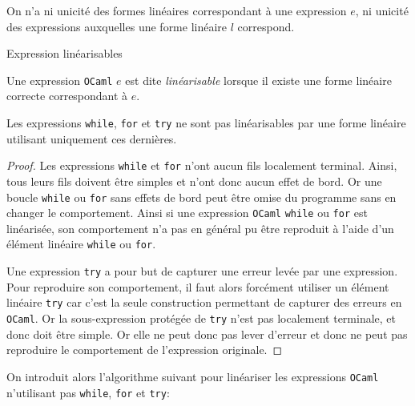 \begin{remark}
    On n'a ni unicité des formes linéaires correspondant à une expression
    $e$, ni unicité des expressions auxquelles une forme linéaire $l$
    correspond.
\end{remark}

\begin{definition}
    Expression linéarisables

    Une expression \texttt{OCaml} $e$ est dite \textit{linéarisable} lorsque
    il existe une forme linéaire correcte correspondant à $e$.
\end{definition}

\begin{proposition}
    Les expressions \textnormal{\texttt{while}}, \textnormal{\texttt{for}} et
    \textnormal{\texttt{try}} ne sont pas linéarisables par une forme linéaire
    utilisant uniquement ces dernières.
\end{proposition}

\begin{proof}
    Les expressions \texttt{while} et \texttt{for} n'ont aucun fils localement
    terminal. Ainsi, tous leurs fils doivent être simples et n'ont donc aucun
    effet de bord. Or une boucle \texttt{while} ou \texttt{for} sans effets de
    bord peut être omise du programme sans en changer le comportement. Ainsi si
    une expression \texttt{OCaml} \texttt{while} ou \texttt{for} est linéarisée,
    son comportement n'a pas en général pu être reproduit à l'aide d'un élément
    linéaire \texttt{while} ou \texttt{for}.


    Une expression \texttt{try} a pour but de capturer une erreur levée par une
    expression. Pour reproduire son comportement, il faut alors forcément
    utiliser un élément linéaire \texttt{try} car c'est la seule construction
    permettant de capturer des erreurs en \texttt{OCaml}. Or la sous-expression
    protégée de \texttt{try} n'est pas localement terminale, et donc doit être
    simple. Or elle ne peut donc pas lever d'erreur et donc ne peut pas
    reproduire le comportement de l'expression originale.
\end{proof}

On introduit alors l'algorithme suivant pour linéariser les expressions
\texttt{OCaml} n'utilisant pas \texttt{while}, \texttt{for} et \texttt{try}:

